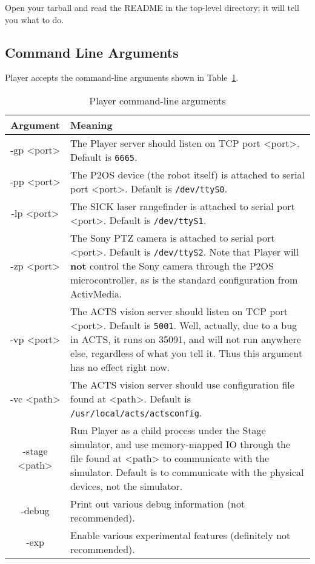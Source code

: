 \documentclass[11pt]{article}
\begin{document}
Open your tarball and read the README in the top-level directory;
it will tell you what to do.

\subsection{Command Line Arguments}
\label{commandline}
Player accepts the command-line arguments shown in Table~\ref{commandlinefig}.

\begin{table}[h]
\begin{center}
\begin{tabularx}{\columnwidth}{|c|X|}
\hline
Argument & Meaning  \\
\hline
-gp <port> & The Player server should listen on TCP port <port>.  Default
is {\tt 6665}. \\
\hline
-pp <port> & The P2OS device (the robot itself) is attached to serial 
port <port>.  Default is {\tt /dev/ttyS0}. \\
\hline
-lp <port> & The SICK laser rangefinder is attached to serial port <port>.
Default is {\tt /dev/ttyS1}. \\
\hline
-zp <port> & The Sony PTZ camera is attached to serial port <port>.
Default is {\tt /dev/ttyS2}. Note that Player will {\bf not} control the
Sony camera through the P2OS microcontroller, as is the standard
configuration from ActivMedia. \\
\hline
-vp <port> & The ACTS vision server should listen on TCP port <port>.
Default is {\tt 5001}.  Well, actually, due to a bug in ACTS,
it runs on 35091, and will not run anywhere else, regardless of what
you tell it. Thus this argument has no effect right now. \\
\hline
-vc <path> & The ACTS vision server should use configuration file found
at <path>.  Default is {\tt /usr/local/acts/actsconfig}. \\
\hline
-stage <path> & Run Player as a child process under the Stage simulator,
and use memory-mapped IO through the file found at <path> to communicate
with the simulator. Default is to communicate with the physical
devices, not the simulator.\\
\hline
-debug  & Print out various debug information (not recommended). \\
\hline
-exp  & Enable various experimental features (definitely not recommended). \\
\hline
\end{tabularx}
\end{center}
\caption{Player command-line arguments}
\label{commandlinefig}
\end{table}
\end{document}
